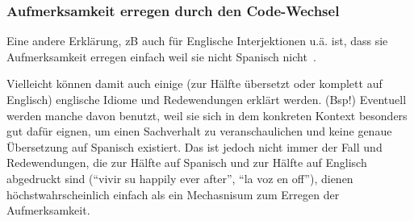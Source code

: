 \subsubsection{Aufmerksamkeit erregen durch den Code-Wechsel}
Eine andere Erklärung, zB auch für Englische Interjektionen u.ä. ist, dass sie Aufmerksamkeit erregen einfach weil sie nicht Spanisch nicht~\cite[]{Mahootian05}. %

Vielleicht können damit auch einige (zur Hälfte übersetzt oder komplett auf Englisch) englische Idiome und Redewendungen erklärt werden.
(Bsp!)
Eventuell werden manche davon benutzt, weil sie sich in dem konkreten Kontext besonders gut dafür eignen, um einen Sachverhalt zu veranschaulichen und keine genaue Übersetzung auf Spanisch existiert.
Das ist jedoch nicht immer der Fall und Redewendungen, die zur Hälfte auf Spanisch und zur Hälfte auf Englisch abgedruckt sind (``vivir su happily ever after'', ``la voz en off''), dienen höchstwahrscheinlich einfach als ein Mechasnisum zum Erregen der Aufmerksamkeit.

